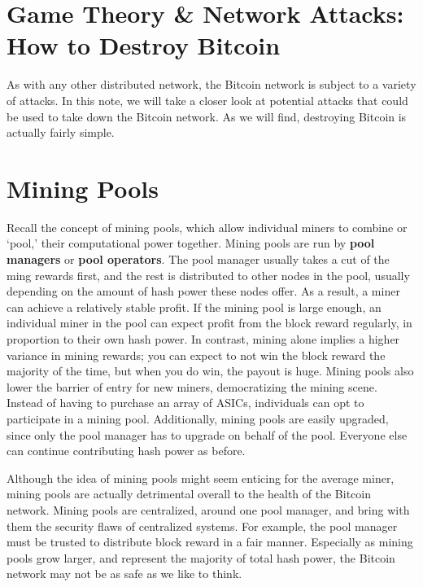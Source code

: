 \documentclass[full.tex]{subfiles}
\begin{document}
    \thispagestyle{firstpage}
    \vspace*{2\baselineskip}
    \section*{Game Theory \& Network Attacks: How to Destroy Bitcoin}
    
    As with any other distributed network, the Bitcoin network is subject to a variety of attacks. In this note, we will take a closer look at potential attacks that could be used to take down the Bitcoin network. As we will find, destroying Bitcoin is actually fairly simple.
    
    \section*{Mining Pools}
    
    Recall the concept of mining pools, which allow individual miners to combine or `pool,' their computational power together. Mining pools are run by \textbf{pool managers} or \textbf{pool operators}. The pool manager usually takes a cut of the ming rewards first, and the rest is distributed to other nodes in the pool, usually depending on the amount of hash power these nodes offer. As a result, a miner can achieve a relatively stable profit. If the mining pool is large enough, an individual miner in the pool can expect profit from the block reward regularly, in proportion to their own hash power. In contrast, mining alone implies a higher variance in mining rewards; you can expect to not win the block reward the majority of the time, but when you do win, the payout is huge. Mining pools also lower the barrier of entry for new miners, democratizing the mining scene. Instead of having to purchase an array of ASICs, individuals can opt to participate in a mining pool. Additionally, mining pools are easily upgraded, since only the pool manager has to upgrade on behalf of the pool. Everyone else can continue contributing hash power as before.
    
    Although the idea of mining pools might seem enticing for the average miner, mining pools are actually detrimental overall to the health of the Bitcoin network. Mining pools are centralized, around one pool manager, and bring with them the security flaws of centralized systems. For example, the pool manager must be trusted to distribute block reward in a fair manner. Especially as mining pools grow larger, and represent the majority of total hash power, the Bitcoin network may not be as safe as we like to think.
    
\end{document}
